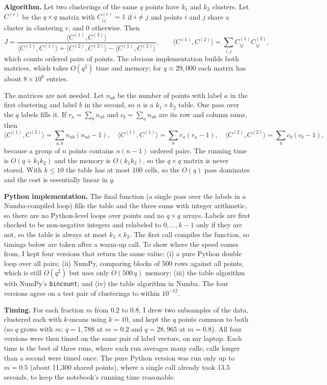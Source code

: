 \documentclass[10pt,letterpaper]{article}
\begin{document}
\textbf{Algorithm.} Let two clusterings of the same $q$ points have $k_1$ and $k_2$ clusters. Let $C^{(r)}$ be the $q\times q$ matrix with $C^{(r)}_{ij}=1$ if $i\neq j$ and points $i$ and $j$ share a cluster in clustering $r$, and $0$ otherwise. Then
\[
J=\frac{\langle C^{(1)},C^{(2)}\rangle}{\langle C^{(1)},C^{(1)}\rangle+\langle C^{(2)},C^{(2)}\rangle-\langle C^{(1)},C^{(2)}\rangle},
\qquad \langle C^{(1)},C^{(2)}\rangle=\sum_{i,j}C^{(1)}_{ij}C^{(2)}_{ij},
\]
which counts ordered pairs of points. The obvious implementation builds both matrices, which takes $O(q^2)$ time and memory; for $q\approx 29{,}000$ each matrix has about $8\times10^{8}$ entries.

The matrices are not needed. Let $n_{ab}$ be the number of points with label $a$ in the first clustering and label $b$ in the second, so $n$ is a $k_1\times k_2$ table. One pass over the $q$ labels fills it. If $r_a=\sum_b n_{ab}$ and $c_b=\sum_a n_{ab}$ are its row and column sums, then
\[
\langle C^{(1)},C^{(2)}\rangle=\sum_{a,b}n_{ab}(n_{ab}-1),\quad
\langle C^{(1)},C^{(1)}\rangle=\sum_a r_a(r_a-1),\quad
\langle C^{(2)},C^{(2)}\rangle=\sum_b c_b(c_b-1),
\]
because a group of $n$ points contains $n(n-1)$ ordered pairs. The running time is $O(q+k_1k_2)$ and the memory is $O(k_1k_2)$, so the $q\times q$ matrix is never stored. With $k\le 10$ the table has at most 100 cells, so the $O(q)$ pass dominates and the cost is essentially linear in $q$.

\textbf{Python implementation.} The final function (a single pass over the labels in a Numba-compiled loop) fills the table and the three sums with integer arithmetic, so there are no Python-level loops over points and no $q\times q$ arrays. Labels are first checked to be non-negative integers and relabeled to $0,\dots,k-1$ only if they are not, so the table is always at most $k_1\times k_2$. The first call compiles the function, so timings below are taken after a warm-up call. To show where the speed comes from, I kept four versions that return the same value: (i) a pure Python double loop over all pairs; (ii) NumPy, comparing blocks of 500 rows against all points, which is still $O(q^2)$ but uses only $O(500\,q)$ memory; (iii) the table algorithm with NumPy's \texttt{bincount}; and (iv) the table algorithm in Numba. The four versions agree on a test pair of clusterings to within $10^{-12}$.

\textbf{Timing.} For each fraction $m$ from $0.2$ to $0.8$, I drew two subsamples of the data, clustered each with $k$-means using $k=10$, and kept the $q$ points common to both (so $q$ grows with $m$; $q=1{,}788$ at $m=0.2$ and $q=28{,}965$ at $m=0.8$). All four versions were then timed on the same pair of label vectors, on my laptop. Each time is the best of three runs, where each run averages many calls; calls longer than a second were timed once. The pure Python version was run only up to $m=0.5$ (about 11,300 shared points), where a single call already took 13.5 seconds, to keep the notebook's running time reasonable.
\end{document}
